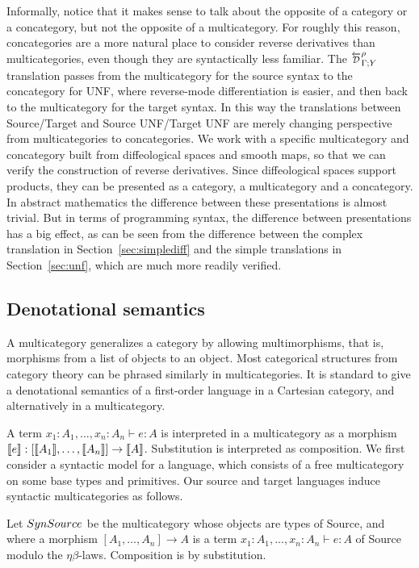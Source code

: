 Informally, notice that it makes sense to talk about the opposite of a category or a concategory, but not the opposite of a multicategory. 
For roughly this reason, concategories are a more natural place to consider reverse derivatives than multicategories, 
even though they are syntactically less familiar. 
The $\directD{\rho}{\Gamma}{Y}$ translation passes from the multicategory for the source syntax to the concategory for UNF, where reverse-mode differentiation is easier, and then back to the multicategory for the target syntax. 
In this way the translations between Source/Target and Source UNF/Target UNF are merely changing perspective from multicategories to concategories.
We work with a specific multicategory and concategory built from diffeological spaces and smooth maps, so that we can verify the construction of reverse derivatives. 
Since diffeological spaces support products, they can be presented as a category, a multicategory and a concategory. 
In abstract mathematics the difference between these presentations is almost trivial. 
But in terms of programming syntax, the difference between presentations has a big effect, as can be seen from the difference between the complex translation in Section~\ref{sec:simplediff} and the simple translations in Section~\ref{sec:unf}, which are much more readily verified.

\subsection{Denotational semantics} %
\label{sub:Denotational semantics source and Target}

A multicategory generalizes a category by allowing multimorphisms, that is, morphisms from a list of objects to an object.
Most categorical structures from category theory can be phrased similarly in multicategories.
It is standard to give a denotational semantics of a first-order language in a Cartesian category, and alternatively in a multicategory.

A term $x_1:A_1,\ldots,x_n:A_n\vdash e:A$ is interpreted in a multicategory as a morphism $\llbracket e\rrbracket:[\llbracket A_1\rrbracket,\ldots,\llbracket A_n\rrbracket]\to \llbracket A\rrbracket$.
Substitution is interpreted as composition. We first consider a syntactic model for a language, which consists of a 
free multicategory on some base types and primitives. Our source and target languages induce syntactic multicategories as follows.

\begin{definition}
    Let $SynSource$ be the multicategory whose objects are types of Source, and where a morphism 
    $[A_1,\ldots,A_n]\to A$ is a term $x_1:A_1,\ldots,x_n:A_n\vdash e:A$ of Source modulo the $\eta\beta$-laws.
    Composition is by substitution.
\end{definition}

